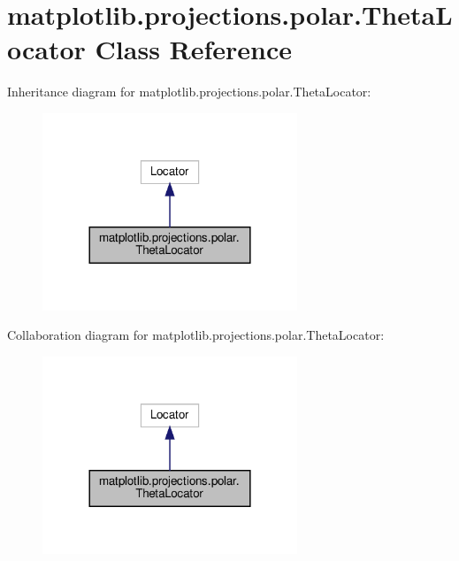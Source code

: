 \hypertarget{classmatplotlib_1_1projections_1_1polar_1_1ThetaLocator}{}\section{matplotlib.\+projections.\+polar.\+Theta\+Locator Class Reference}
\label{classmatplotlib_1_1projections_1_1polar_1_1ThetaLocator}


Inheritance diagram for matplotlib.\+projections.\+polar.\+Theta\+Locator\+:
\nopagebreak
\begin{figure}[H]
\begin{center}
\leavevmode
\includegraphics[width=216pt]{classmatplotlib_1_1projections_1_1polar_1_1ThetaLocator__inherit__graph}
\end{center}
\end{figure}


Collaboration diagram for matplotlib.\+projections.\+polar.\+Theta\+Locator\+:
\nopagebreak
\begin{figure}[H]
\begin{center}
\leavevmode
\includegraphics[width=216pt]{classmatplotlib_1_1projections_1_1polar_1_1ThetaLocator__coll__graph}
\end{center}
\end{figure}
